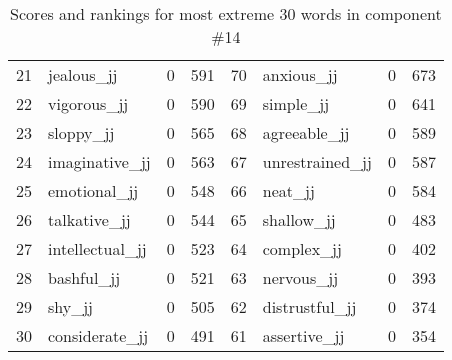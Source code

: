 \begin{table}[tbp]
\begin{tabular}{| rlr@{.}l | rlr@{.}l |}
    21 & jealous\_jj & 0 & 591    &    70 & anxious\_jj & 0 & 673 \\
    22 & vigorous\_jj & 0 & 590    &    69 & simple\_jj & 0 & 641 \\
    23 & sloppy\_jj & 0 & 565    &    68 & agreeable\_jj & 0 & 589 \\
    24 & imaginative\_jj & 0 & 563    &    67 & unrestrained\_jj & 0 & 587 \\
    25 & emotional\_jj & 0 & 548    &    66 & neat\_jj & 0 & 584 \\
    26 & talkative\_jj & 0 & 544    &    65 & shallow\_jj & 0 & 483 \\
    27 & intellectual\_jj & 0 & 523    &    64 & complex\_jj & 0 & 402 \\
    28 & bashful\_jj & 0 & 521    &    63 & nervous\_jj & 0 & 393 \\
    29 & shy\_jj & 0 & 505    &    62 & distrustful\_jj & 0 & 374 \\
    30 & considerate\_jj & 0 & 491    &    61 & assertive\_jj & 0 & 354 \\
    \hline
    \end{tabular}
    \caption{Scores and rankings for most extreme 30 words in component \#14} 
\end{table}
\clearpage
